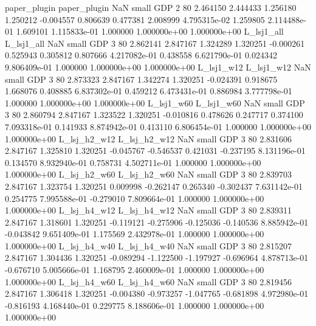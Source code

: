   paper_plugin   paper_plugin                   NaN      small      GDP                 2 80 2.464150       2.444433 1.256180       1.250212   -0.004557      0.806639      0.477381     2.008999   4.795315e-02  1.259805 2.114488e-01     1.609101   1.115833e-01            1.000000    1.000000e+00        1.000000e+00
    L_lsj1_all     L_lsj1_all                   NaN      small      GDP                 3 80 2.862141       2.847167 1.324289       1.320251   -0.000261      0.525943      0.305812     0.807666   4.217082e-01  0.438558 6.621790e-01     0.024342   9.806409e-01            1.000000    1.000000e+00        1.000000e+00
    L_lsj1_w12     L_lsj1_w12                   NaN      small      GDP                 3 80 2.873323       2.847167 1.342274       1.320251   -0.024391      0.918675      1.668076     0.408885   6.837302e-01  0.459212 6.473431e-01     0.886984   3.777798e-01            1.000000    1.000000e+00        1.000000e+00
    L_lsj1_w60     L_lsj1_w60                   NaN      small      GDP                 3 80 2.860794       2.847167 1.323522       1.320251   -0.010816      0.478626      0.247717     0.374100   7.093318e-01  0.141933 8.874942e-01     0.413110   6.806454e-01            1.000000    1.000000e+00        1.000000e+00
  L_lsj_h2_w12   L_lsj_h2_w12                   NaN      small      GDP                 3 80 2.831606       2.847167 1.325810       1.320251   -0.045767     -0.546537      0.421031    -0.237195   8.131196e-01  0.134570 8.932940e-01     0.758731   4.502711e-01            1.000000    1.000000e+00        1.000000e+00
  L_lsj_h2_w60   L_lsj_h2_w60                   NaN      small      GDP                 3 80 2.839703       2.847167 1.323754       1.320251    0.009998     -0.262147      0.265340    -0.302437   7.631142e-01  0.254775 7.995588e-01    -0.279010   7.809664e-01            1.000000    1.000000e+00        1.000000e+00
  L_lsj_h4_w12   L_lsj_h4_w12                   NaN      small      GDP                 3 80 2.839311       2.847167 1.318601       1.320251   -0.119121     -0.275906     -0.125036    -0.140536   8.885942e-01 -0.043842 9.651409e-01     1.175569   2.432978e-01            1.000000    1.000000e+00        1.000000e+00
  L_lsj_h4_w40   L_lsj_h4_w40                   NaN      small      GDP                 3 80 2.815207       2.847167 1.304436       1.320251   -0.089294     -1.122500     -1.197927    -0.696964   4.878713e-01 -0.676710 5.005666e-01     1.168795   2.460009e-01            1.000000    1.000000e+00        1.000000e+00
  L_lsj_h4_w60   L_lsj_h4_w60                   NaN      small      GDP                 3 80 2.819456       2.847167 1.306418       1.320251   -0.004380     -0.973257     -1.047765    -0.681898   4.972980e-01 -0.816193 4.168440e-01     0.229775   8.188606e-01            1.000000    1.000000e+00        1.000000e+00
